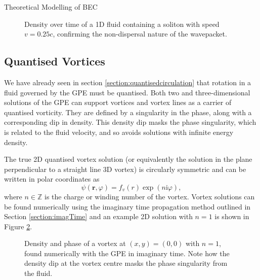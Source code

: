 \begin{chapter}{\label{cha:theoretical_model}Theoretical Modelling of BEC}
\begin{figure}[!ht]
  \caption{Density over time of a 1D fluid containing a soliton with speed $v=0.25c$, confirming the non-dispersal nature of the wavepacket.}\label{fig_solitonmove}
 \end{figure}


\subsection{\label{section:vortices} Quantised Vortices}
We have already seen in section \ref{section:quantisedcirculation} that rotation in a fluid governed by the GPE must be quantised. Both two and three-dimensional solutions of the GPE can support vortices and vortex lines as a carrier of quantised vorticity. They are defined by a singularity in the phase, along with a corresponding dip in density. This density dip masks the phase singularity, which is related to the fluid velocity, and so avoids solutions with infinite energy density.

The true 2D quantised vortex solution (or equivalently the solution in the plane perpendicular to a straight line 3D vortex) is circularly symmetric and can be written in polar coordinates as
	\begin{equation}\label{eq_vortexsol}
	\psi(\mathbf{r},\varphi) = f_v(r)\exp(n\mathrm{i}\varphi),
	\end{equation}
where $n\in\mathbb{Z}$ is the charge or winding number of the vortex. Vortex solutions can be found numerically using the imaginary time propagation method outlined in Section \ref{section:imagTime} and an example 2D solution with $n=1$ is shown in Figure \ref{fig_vortexdensphase}.

\begin{figure}[!ht]
	\centering
  \caption{Density and phase of a vortex at $(x,y) = (0,0)$ with $n=1$, found numerically with the GPE in imaginary time. Note how the density dip at the vortex centre masks the phase singularity from the fluid. }\label{fig_vortexdensphase}
 \end{figure}


\end{chapter}
